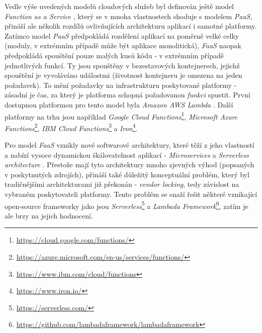 Vedle výše uvedených modelů cloudových služeb byl definován ještě model \textit{Function as a Service} \cite{Roberts16}, který se v mnoha vlastnostech shoduje s modelem \textit{PaaS}, přináší ale několik rozdílů ovlivňujících architekturu aplikací i samotné platformy. Zatímco model \textit{PaaS} předpokládá rozdělení aplikací na poměrně velké celky (moduly, v extrémním případě může být aplikace monolitická), \textit{FaaS} naopak předpokládá spouštění pouze malých kusů kódu - v extrémním případě jednotlivých funkcí. Ty jsou spouštěny v bezestavových kontejnerech, jejichž spouštění je vyvoláváno událostmi (životnost kontejneru je omezena na jeden požadavek). To mění požadavky na infrastrukturu poskytované platformy - zásadní je čas, za který je platforma schopná požadovanou \textit{funkci} spustit. První dostupnou platformou pro tento model byla \textit{Amazon AWS Lambda} \cite{Amazon14}. Další platformy na trhu jsou například \textit{Google Cloud Functions}\footnote{\url{https://cloud.google.com/functions/}}, \textit{Microsoft Azure Functions}\footnote{\url{https://azure.microsoft.com/en-us/services/functions/}}, \textit{IBM Cloud Functions}\footnote{\url{https://www.ibm.com/cloud/functions}} a \textit{Iron}\footnote{\url{https://www.iron.io/}}.

Pro model \textit{FaaS} vznikly nové softwarové architektury, které těží z jeho vlastností a nabízí vysoce dynamickou škálovatelnost aplikací - \textit{Microservices} \cite{Fowler14} a \textit{Serverless architecture} \cite{Roberts16}. Přestože mají tyto architektury mnoho zjevných výhod (popsaných v poskytnutých zdrojích), přináší také důležitý konceptuální problém, který byl tradičnějšími architekturami již překonán - \textit{vendor locking}, tedy závislost na vybraném poskytovateli platformy. Tento problém se snaží řešit některé vznikající open-source frameworky jako jsou \textit{Serverless}\footnote{\url{https://serverless.com/}} a \textit{Lambada Framework}\footnote{\url{https://github.com/lambadaframework/lambadaframework}}, zatím je ale brzy na jejich hodnocení.
